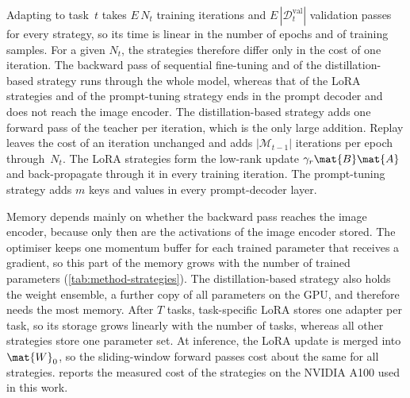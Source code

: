 Adapting to task~$t$ takes $E\,N_t$ training iterations and $E\,|\mathcal{D}_t^{\mathrm{val}}|$ validation passes for every strategy, so its time is linear in the number of epochs and of training samples.
For a given $N_t$, the strategies therefore differ only in the cost of one iteration.
The backward pass of sequential fine-tuning and of the distillation-based strategy runs through the whole model, whereas that of the LoRA strategies and of the prompt-tuning strategy ends in the prompt decoder and does not reach the image encoder.
The distillation-based strategy adds one forward pass of the teacher per iteration, which is the only large addition.
Replay leaves the cost of an iteration unchanged and adds $|\mathcal{M}_{t-1}|$ iterations per epoch through~$N_t$.
The LoRA strategies form the low-rank update $\gamma_r\mat{B}\mat{A}$ and back-propagate through it in every training iteration.
The prompt-tuning strategy adds $m$ keys and values in every prompt-decoder layer.

Memory depends mainly on whether the backward pass reaches the image encoder, because only then are the activations of the image encoder stored.
The optimiser keeps one momentum buffer for each trained parameter that receives a gradient, so this part of the memory grows with the number of trained parameters (\cref{tab:method-strategies}).
The distillation-based strategy also holds the weight ensemble, a further copy of all parameters on the GPU, and therefore needs the most memory.
After $T$ tasks, task-specific LoRA stores one adapter per task, so its storage grows linearly with the number of tasks, whereas all other strategies store one parameter set.
At inference, the LoRA update is merged into $\mat{W}_0$, so the sliding-window forward passes cost about the same for all strategies.
 reports the measured cost of the strategies on the NVIDIA A100 used in this work.

